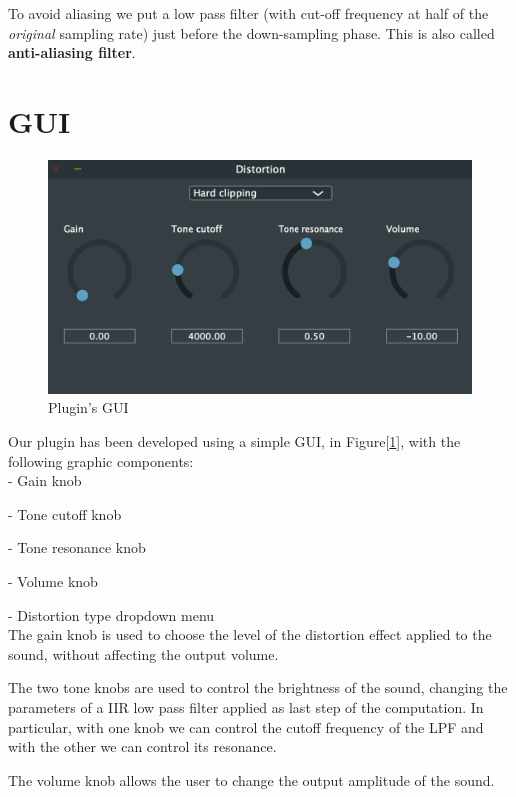 \documentclass[letterpaper, 12pt]{article}
\begin{document}
	To avoid aliasing we put a low pass filter (with cut-off frequency at half of the \textsl{original} sampling rate) just before the down-sampling phase. This is also called \textbf{anti-aliasing filter}.

	
	\section{GUI}
	
	\begin{figure}[h!]
		\includegraphics[scale=0.7]{gui.png}
		\centering
		\caption{Plugin's GUI}
		\label{fig:gui}
	\end{figure}

	Our plugin has been developed using a simple GUI, in Figure[\ref{fig:gui}], with the following graphic components:
	\\
	
	
	-	Gain knob 
	
	-	Tone cutoff knob 
	
	-	Tone resonance knob
	
	-	Volume knob
	
	-	Distortion type dropdown menu
	\\
	
	
	The gain knob is used to choose the level of the distortion effect applied to the sound, without affecting the output volume.
	
	The two tone knobs are used to control the brightness of the sound, changing the parameters of a IIR low pass filter applied as last step of the computation. In particular, with one knob we can control the cutoff frequency of the LPF and with the other we can control its resonance. 
	
	The volume knob allows the user to change the output amplitude of the sound.
	
\end{document}
